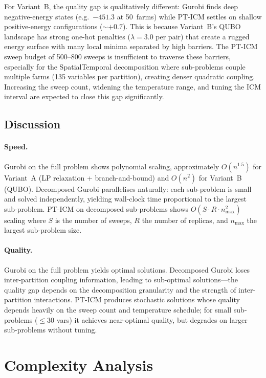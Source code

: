 \documentclass[11pt,a4paper]{article}
\begin{document}
For Variant~B, the quality gap is qualitatively different: Gurobi finds deep
negative-energy states (e.g.\ $-451.3$ at 50~farms) while PT-ICM settles on
shallow positive-energy configurations ($\sim+0.7$).  This is because
Variant~B's QUBO landscape has strong one-hot penalties ($\lambda = 3.0$ per pair)
that create a rugged energy surface with many local minima separated by high
barriers.  The PT-ICM sweep budget of 500--800 sweeps is insufficient to traverse
these barriers, especially for the SpatialTemporal decomposition where sub-problems
couple multiple farms (135 variables per partition), creating denser
quadratic coupling.  Increasing the sweep count, widening the temperature range,
and tuning the ICM interval are expected to close this gap significantly.

\subsection{Discussion}

\paragraph{Speed.}
Gurobi on the full problem shows polynomial scaling, approximately $O(n^{1.5})$ for
Variant~A (LP relaxation + branch-and-bound) and $O(n^2)$ for Variant~B (QUBO).
Decomposed Gurobi parallelises naturally: each sub-problem is small and solved
independently, yielding wall-clock time proportional to the largest sub-problem.
PT-ICM on decomposed sub-problems shows $O(S \cdot R \cdot n_{\max}^2)$ scaling
where $S$ is the number of sweeps, $R$ the number of replicas, and $n_{\max}$ the
largest sub-problem size.

\paragraph{Quality.}
Gurobi on the full problem yields optimal solutions.  Decomposed Gurobi loses
inter-partition coupling information, leading to sub-optimal solutions---the quality
gap depends on the decomposition granularity and the strength of inter-partition
interactions.  PT-ICM produces stochastic solutions whose quality depends heavily
on the sweep count and temperature schedule; for small sub-problems ($\le 30$ vars)
it achieves near-optimal quality, but degrades on larger sub-problems without tuning.

\section{Complexity Analysis}
\label{sec:complexity}
\end{document}
